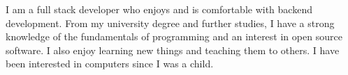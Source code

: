 

\begin{cvparagraph}

I am a full stack developer who enjoys and is comfortable with backend development.
From my university degree and further studies, I have a strong knowledge of the fundamentals of programming and an interest in open source software. 
I also enjoy learning new things and teaching them to others. 
I have been interested in computers since I was a child.

\end{cvparagraph}

